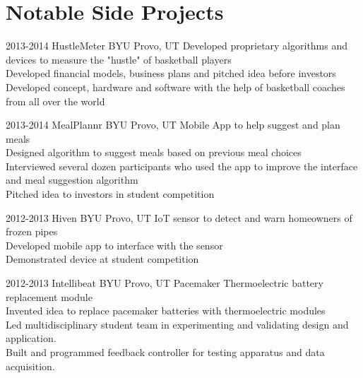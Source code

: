 
\section{Notable Side Projects}

\begin{entrylist}
\entry
{2013-2014}
{HustleMeter}
{BYU Provo, UT}
{
	Developed proprietary algorithms and devices to measure the "hustle" of basketball players \\
	Developed financial models, business plans and pitched idea before investors \\
	Developed concept, hardware and software with the help of basketball coaches from all over the world
}
\end{entrylist}

\begin{entrylist}
\entry
{2013-2014}
{MealPlannr}
{BYU Provo, UT}
{
	Mobile App to help suggest and plan meals \\
	Designed algorithm to suggest meals based on previous meal choices \\
	Interviewed several dozen participants who used the app to improve the interface and meal suggestion algorithm \\
	Pitched idea to investors in student competition
}
\end{entrylist}


\begin{entrylist}
\entry
{2012-2013}
{Hiven}
{BYU Provo, UT}
{
	IoT sensor to detect and warn homeowners of frozen pipes \\
	Developed mobile app to interface with the sensor \\
	Demonstrated device at student competition
}
\end{entrylist}


\begin{entrylist}
\entry
{2012-2013}
{Intellibeat}
{BYU Provo, UT}
{ 
	Pacemaker Thermoelectric battery replacement module \\
	Invented idea to replace pacemaker batteries with thermoelectric modules\\
	Led multidisciplinary student team in experimenting and validating design and application. \\
	Built and programmed feedback controller for testing apparatus and data acquisition.
}
\end{entrylist}
